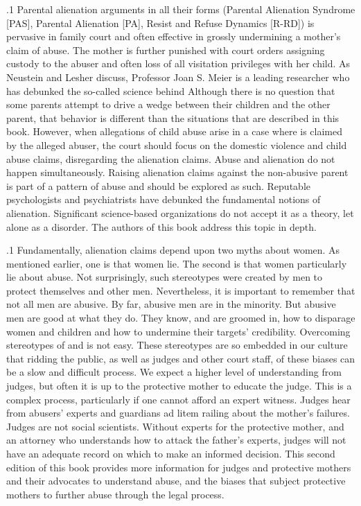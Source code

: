 \documentclass[11pt, twoside]{article}
\begin{document}
{\p.1{%
Parental alienation arguments in all their forms (Parental Alienation
Syndrome [PAS], Parental Alienation [PA], Resist and Refuse Dynamics
[R-RD]) is pervasive in family court and often effective in grossly undermining a mother's claim of abuse. The mother is further punished with
court orders assigning custody to the abuser and often loss of all visitation privileges with her child. As Neustein and Lesher discuss, Professor
Joan S. Meier is a leading researcher who has debunked the so-called
science behind  Although there is no question that some
parents attempt to drive a wedge between their children and the other
parent, that behavior is different than the situations that are described
in this book. However, when allegations of child abuse arise in a case
where  is claimed by the alleged abuser, the court should focus on the domestic violence and child abuse claims, disregarding the
alienation claims. Abuse and alienation do not happen simultaneously.
Raising alienation claims against the non-abusive parent is part of a pattern of abuse and should be explored as such. Reputable psychologists
and psychiatrists have debunked the fundamental notions of alienation.
Significant science-based organizations do not accept it as a theory,
let alone as a disorder. The authors of this book address this topic in
depth.
}%

\p.1{%
Fundamentally, alienation claims depend upon two myths about wo\-men.
As mentioned earlier, one is that women lie. The second is that
women particularly lie about abuse. Not surprisingly, such stereotypes
were created by men to protect themselves and other men.
Nevertheless, it is important to remember that not all men are abusive. By far, abusive men are in the minority. But abusive men are good
at what they do. They know, and are groomed in, how to disparage
women and children and how to undermine their targets' credibility.
Overcoming stereotypes of   and
 is not easy. These stereotypes are so embedded in our culture that ridding the public, as well as judges and other court staff, of
these biases can be a slow and difficult process. We expect a higher
level of understanding from judges, but often it is up to the protective
mother to educate the judge. This is a complex process, particularly if
one cannot afford an expert witness. Judges hear from abusers' experts
and guardians ad litem railing about the mother's failures. Judges are
not social scientists. Without experts for the protective mother, and an
attorney who understands how to attack the father's experts, judges will
not have an adequate record on which to make an informed decision.
This second edition of this book provides more information for judges
and protective mothers and their advocates to understand abuse, and the
biases that subject protective mothers to further abuse through the legal
process.
}%

}
\end{document}
